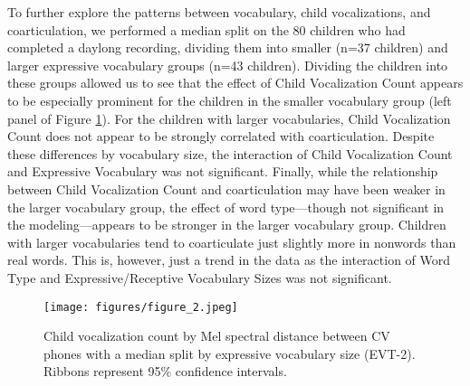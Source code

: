 \documentclass[a4paper,man,natbib,donotrepeattitle, apacite]{apa6}
\begin{document}
To further explore the patterns between vocabulary, child vocalizations, and coarticulation, we performed a median split on the 80 children who had completed a daylong recording, dividing them into smaller (n=37 children) and larger expressive vocabulary groups (n=43 children). Dividing the children into these groups allowed us to see that the effect of Child Vocalization Count appears to be especially prominent for the children in the smaller vocabulary group (left panel of Figure \ref{fig:figure-2}). For the children with larger vocabularies, Child Vocalization Count does not appear to be strongly correlated with coarticulation. Despite these differences by vocabulary size, the interaction of Child Vocalization Count and Expressive Vocabulary was not significant. Finally, while the relationship between Child Vocalization Count and coarticulation may have been weaker in the larger vocabulary group, the effect of word type---though not significant in the modeling---appears to be stronger in the larger vocabulary group. Children with larger vocabularies tend to coarticulate just slightly more in nonwords than real words. This is, however, just a trend in the data as the interaction of Word Type and Expressive/Receptive Vocabulary Sizes was not significant. 


\begin{figure}[H]
\centering
\texttt{[image: figures/figure\_2.jpeg]}
\caption{\label{fig:figure-2}Child vocalization count by Mel spectral distance between CV phones with a median split by expressive vocabulary size (EVT-2). Ribbons represent 95\% confidence intervals.}
\end{figure}
\end{document}

